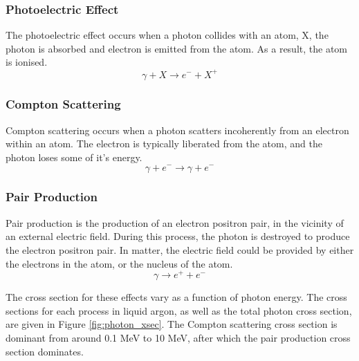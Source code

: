 \subsubsection*{Photoelectric Effect}
The photoelectric effect occurs when a photon collides with an atom, X, the
photon is absorbed and electron is emitted from the atom. As a result, the atom 
is ionised. 
\begin{equation*}
	\gamma + X \rightarrow e^- + X^+
\end{equation*}

\subsubsection*{Compton Scattering}
Compton scattering occurs when a photon scatters incoherently from an electron
within an atom. The electron is typically liberated from the atom, and the
photon loses some of it's energy.
\begin{equation*}
	\gamma + e^- \rightarrow \gamma + e^-
\end{equation*}

\subsubsection*{Pair Production}
Pair production is the production of an electron positron pair, in the 
vicinity of an external electric field. During this process, the photon is
destroyed to produce the electron positron pair. In matter, the electric field
could be provided by either the electrons in the atom, or the nucleus of the
atom.
\begin{equation*}
	\gamma \rightarrow e^+ + e^-
\end{equation*}

\bigskip

The cross section for these effects vary as a function of photon energy. The 
cross sections for each process in liquid argon, as well as the total photon 
cross section, are given in Figure \ref{fig:photon_xsec}. The Compton scattering
cross section is dominant from around 0.1 MeV to 10 MeV, after which the pair
production cross section dominates. 

